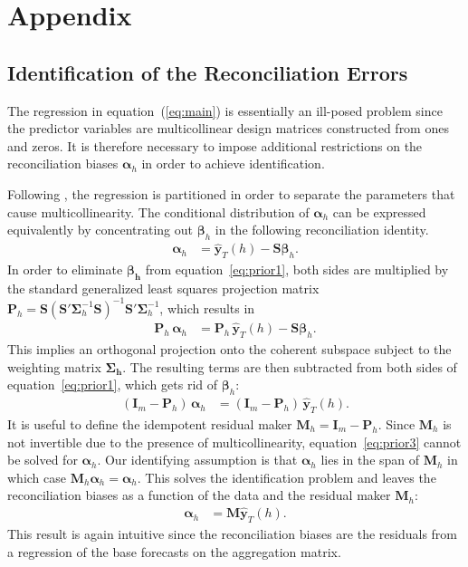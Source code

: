 \appendix
\section{Appendix}
\def\thepage{A\arabic{page}}

\subsection{Identification of the Reconciliation Errors}
\label{sec:proofs}
The regression in equation~(\ref{eq:main}) is essentially an ill-posed problem since the predictor variables are multicollinear design matrices constructed from ones and zeros. It is therefore necessary to impose additional restrictions on the reconciliation biases $\boldsymbol{\alpha}_h$ in order to achieve identification. 

Following \cite{Farebrother1978}, the regression is partitioned in order to separate the parameters that cause multicollinearity. The conditional distribution of $\boldsymbol{\alpha}_h$ can be expressed equivalently by concentrating out $\boldsymbol{\beta}_h$ in the following reconciliation identity.
\begin{align}
	\label{eq:prior1}
	\boldsymbol{\alpha}_h &= \mathbf{\hat{y}}_{T}(h) - \textbf{S}\boldsymbol{\beta}_h.
\end{align}
In order to eliminate $\boldsymbol{\beta_h}$ from equation~\eqref{eq:prior1}, both sides are multiplied by the standard generalized least squares projection matrix $\textbf{P}_h = \textbf{S}(\textbf{S}'\boldsymbol{\Sigma}_h^{-1} \textbf{S})^{-1}\textbf{S}'\boldsymbol{\Sigma}_h^{-1}$, which results in 
\begin{align}
	\label{eq:app2}
	\textbf{P}_h\, \boldsymbol{\alpha}_h &= \textbf{P}_h\, \mathbf{\hat{y}}_{T}(h) - \textbf{S}\boldsymbol{\beta}_h.
\end{align}
This implies an orthogonal projection onto the coherent subspace subject to the weighting matrix $\boldsymbol{\Sigma_h}$. The resulting terms are then subtracted from both sides of equation~\eqref{eq:prior1}, which gets rid of $\boldsymbol{\beta}_h$:
\begin{align}
	\label{eq:prior3}
	(\textbf{I}_m - \textbf{P}_h)\, \boldsymbol{\alpha}_h &= (\textbf{I}_m - \textbf{P}_h)\, \mathbf{\hat{y}}_{T}(h).
\end{align}
It is useful to define the idempotent residual maker $\textbf{M}_h = \textbf{I}_m - \textbf{P}_h$. Since $\textbf{M}_h$ is not invertible due to the presence of multicollinearity, equation~\eqref{eq:prior3} cannot be solved for $\boldsymbol{\alpha}_h$. Our identifying assumption is that $\boldsymbol{\alpha}_h$ lies in the span of $\textbf{M}_h$ in which case $\textbf{M}_h\boldsymbol{\alpha}_h = \boldsymbol{\alpha}_h$. This solves the identification problem and leaves the reconciliation biases as a function of the data and the residual maker $\textbf{M}_h$:
\begin{align}
	\boldsymbol{\alpha}_h &= \textbf{M} \mathbf{\hat{y}}_{T}(h).
\end{align}
This result is again intuitive since the reconciliation biases are the residuals from a regression of the base forecasts on the aggregation matrix.

